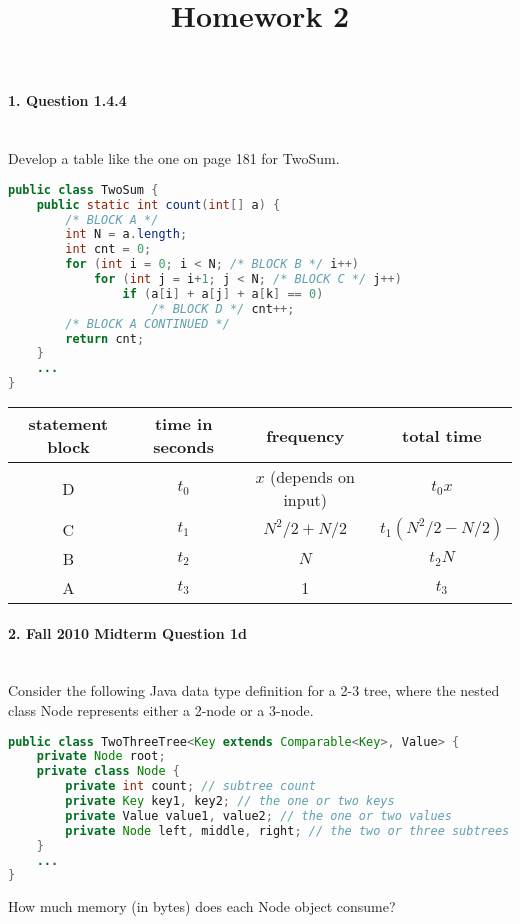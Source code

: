 \documentclass{article}
\begin{document}
\title{Homework 2}
\date{}
\maketitle

\paragraph{\Large 1. Question 1.4.4}\mbox{}\\
Develop a table like the one on page 181 for TwoSum.\\
\begin{lstlisting}[language=Java]
public class TwoSum {
    public static int count(int[] a) {
        /* BLOCK A */
        int N = a.length;
        int cnt = 0;
        for (int i = 0; i < N; /* BLOCK B */ i++)
            for (int j = i+1; j < N; /* BLOCK C */ j++)
                if (a[i] + a[j] + a[k] == 0)
                    /* BLOCK D */ cnt++;
        /* BLOCK A CONTINUED */
        return cnt;
    }
    ...
}
\end{lstlisting}
\begin{tabular}{c c c c}
statement block & time in seconds & frequency & total time \\ \hline
D & $t_0$ & $x$ (depends on input) & $t_0x$ \\
C & $t_1$ & $N^2/2+N/2$ & $t_1(N^2/2-N/2)$\\
B & $t_2$ & $N$ & $t_2N$ \\
A & $t_3$ & 1 & $t_3$ \\
\end{tabular}


\paragraph{\Large 2. Fall 2010 Midterm Question 1d}\mbox{}\\
Consider the following Java data type definition for a 2-3 tree, where the nested class
Node represents either a 2-node or a 3-node.
\begin{lstlisting}[language=Java]
public class TwoThreeTree<Key extends Comparable<Key>, Value> {
    private Node root;
    private class Node {
        private int count; // subtree count
        private Key key1, key2; // the one or two keys
        private Value value1, value2; // the one or two values
        private Node left, middle, right; // the two or three subtrees
    }
    ...
}
\end{lstlisting}
How much memory (in bytes) does each Node object consume?
\end{document}
